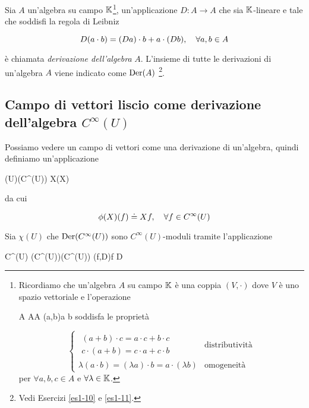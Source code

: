 Sia $ A $ un'algebra su campo $ \mathbb{K} $\footnote{%
	Ricordiamo che un'algebra $ A $ su campo $ \mathbb{K} $ è una coppia $ (V, \cdot) $ dove $ V $ è uno spazio vettoriale e l'operazione
	
	\maps{\cdot}
		{A \times A}{A}
		{(a,b)}{a \cdot b}
	soddisfa le proprietà
	
	\begin{equation*}
		\begin{cases}
			\begin{split}
				(a + b) \cdot c = a \cdot c + b \cdot c\\
				c \cdot (a + b) = c \cdot a + c \cdot b
			\end{split} & \text{distributività}\\
			\lambda (a \cdot b) = (\lambda a) \cdot b = a \cdot (\lambda b) & \text{omogeneità}
		\end{cases}
	\end{equation*}
	per $ \forall a,b,c \in A $ e $ \forall \lambda \in \mathbb{K} $.%
}, un'applicazione $ D : A \to A $ che sia $ \mathbb{K} $-lineare e tale che soddisfi la regola di Leibniz

\begin{equation}
	D (a \cdot b) = (D a) \cdot b + a \cdot (D b) \qcomma \forall a, b \in A
\end{equation}

è chiamata \textit{derivazione dell'algebra} $ A $. L'insieme di tutte le derivazioni di un'algebra $ A $ viene indicato come $ \operatorname{Der}(A) $
\footnote{%
	Vedi Esercizi \ref{es1-10} e \ref{es1-11}.%
}.

\subsection{Campo di vettori liscio come derivazione dell'algebra $ C^{\infty}(U) $}

Possiamo vedere un campo di vettori come una derivazione di un'algebra, quindi definiamo un'applicazione

\map{\phi}
	{\chi(U)}{\der(C^{\infty}(U))}
	{X}{\phi(X)}

da cui

\begin{equation}
	\phi(X) (f) \doteq X f \qcomma \forall f \in C^{\infty}(U)
\end{equation}

Sia $ \chi(U) $ che $ \operatorname{Der}(C^{\infty}(U)) $ sono $ C^{\infty}(U) $-moduli tramite l'applicazione

\map{\cdot}
	{C^{\infty}(U) \times \der(C^{\infty}(U))}{\der(C^{\infty}(U))}
	{(f,D)}{f D}

